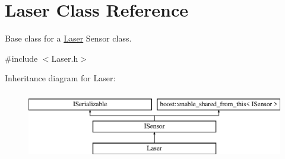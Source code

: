 \hypertarget{class_laser}{}\section{Laser Class Reference}
\label{class_laser}


Base class for a \hyperlink{class_laser}{Laser} Sensor class.  




{\ttfamily \#include $<$Laser.\+h$>$}

Inheritance diagram for Laser\+:\begin{figure}[H]
\begin{center}
\leavevmode
\includegraphics[height=3.000000cm]{class_laser}
\end{center}
\end{figure}
